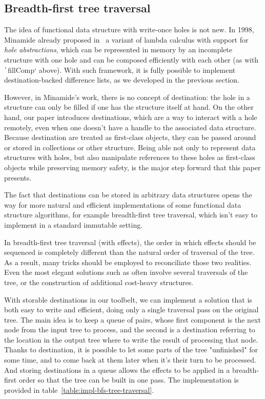 \documentclass[english]{jflart}
\begin{document}
\subsection{Breadth-first tree traversal}

The idea of functional data structure with write-once holes is not new. In 1998, Minamide already proposed in~\cite{minamide_functional_1998} a variant of lambda calculus with support for \emph{hole abstractions}, which can be represented in memory by an incomplete structure with one hole and can be composed efficiently with each other (as with \texttt`fillComp` above). With such framework, it is fully possible to implement destination-backed difference lists, as we developed in the previous section.

However, in Minamide's work, there is no concept of destination: the hole in a structure can only be filled if one has the structure itself at hand. On the other hand, our paper introduces destinations, which are a way to interact with a hole remotely, even when one doesn't have a handle to the associated data structure. Because destination are treated as first-class objects, they can be passed around or stored in collections or other structure. Being able not only to represent data structures with holes, but also manipulate references to these holes as first-class objects while preserving memory safety, is the major step forward that this paper presents.

The fact that destinations can be stored in arbitrary data structures opens the way for more natural and efficient implementations of some functional data structure algorithms, for example breadth-first tree traversal, which isn't easy to implement in a standard immutable setting.

In breadth-first tree traversal (with effects), the order in which effects should be sequenced is completely different than the natural order of traversal of the tree. As a result, many tricks should be employed to reconciliate those two realities. Even the most elegant solutions such as \cite{gibbons_phases_2023} often involve several traversals of the tree, or the construction of additional cost-heavy structures.

With storable destinations in our toolbelt, we can implement a solution that is both easy to write and efficient, doing only a single traversal pass on the original tree. The main idea is to keep a queue of pairs, whose first component is the next node from the input tree to process, and the second is a destination referring to the location in the output tree where to write the result of processing that node. Thanks to destination, it is possible to let some parts of the tree "unfinished" for some time, and to come back at them later when it's their turn to be processed. And storing destinations in a queue allows the effects to be applied in a breadth-first order so that the tree can be built in one pass. The implementation is provided in table~\ref{table:impl-bfs-tree-traversal}.
\end{document}
